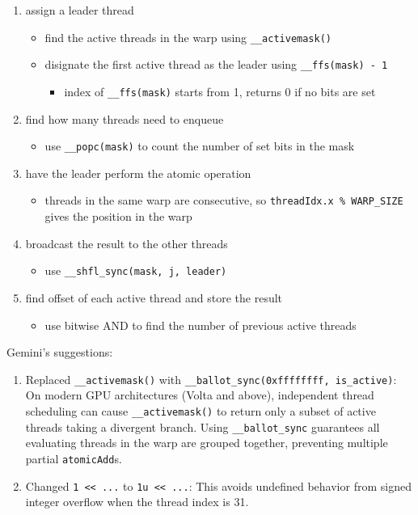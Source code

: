 \documentclass{article}
\begin{document}
\begin{enumerate}
\item assign a leader thread
\begin{itemize}
\item find the active threads in the warp using \texttt{\_\_activemask()}
\item disignate the first active thread as the leader using \texttt{\_\_ffs(mask) - 1}
\begin{itemize}
\item index of \texttt{\_\_ffs(mask)} starts from 1, returns 0 if no bits are set
\end{itemize}
\end{itemize}
\item find how many threads need to enqueue
\begin{itemize}
\item use \texttt{\_\_popc(mask)} to count the number of set bits in the mask
\end{itemize}
\item have the leader perform the atomic operation
\begin{itemize}
\item threads in the same warp are consecutive, so \texttt{threadIdx.x \% WARP\_SIZE} gives the position in the warp
\end{itemize}
\item broadcast the result to the other threads
\begin{itemize}
\item use \texttt{\_\_shfl\_sync(mask, j, leader)}
\end{itemize}
\item find offset of each active thread and store the result
\begin{itemize}
\item use bitwise AND to find the number of previous active threads

\end{itemize}
\end{enumerate}
Gemini's suggestions:

\begin{enumerate}
\item Replaced \texttt{\_\_activemask()} with \texttt{\_\_ballot\_sync(0xffffffff, is\_active)}: On modern GPU architectures (Volta and above), independent thread scheduling can cause \texttt{\_\_activemask()} to return only a subset of active threads taking a divergent branch. Using \texttt{\_\_ballot\_sync} guarantees all evaluating threads in the warp are grouped together, preventing multiple partial \texttt{atomicAdd}s.
\item Changed \texttt{1 << ...} to \texttt{1u << ...}: This avoids undefined behavior from signed integer overflow when the thread index is 31.
\end{enumerate}
\end{document}
